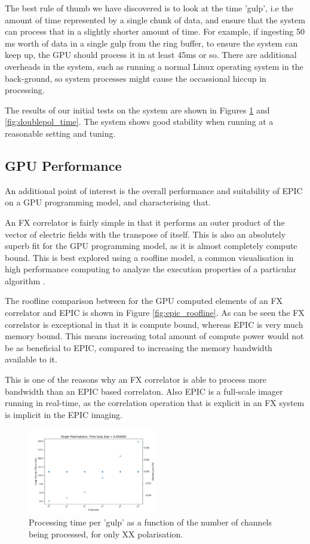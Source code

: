 \documentclass[bibliography=totocnumbered, twocolumn]{article}
\begin{document}
The best rule of thumb we have discovered is to look at the time
'gulp', i.e the amount of time represented by a single chunk of
data, and ensure that the system can process that in a slightly
shorter amount of time. For example, if ingesting 50 ms worth
of data in a single gulp from the ring buffer, to ensure the
system can keep up, the GPU should process it in at least 45ms
or so. There are additional overheads in the system, such as
running a normal Linux operating system in the back-ground,
so system processes might cause the occassional hiccup in
processing.

The results of our initial tests on the system are shown in
Figures \ref{fig:singlepol_time} and \ref{fig:doublepol_time}. The
system shows good stability when running at a reasonable setting
and tuning.

\subsection{GPU Performance}

An additional point of interest is the overall performance and
suitability of EPIC on a GPU programming model, and characterising
that.

An FX correlator is fairly simple in that it performs an outer
product of the vector of electric fields with the transpose of
itself. This is also an absolutely superb fit for the GPU
programming model, as it is almost completely compute bound. This
is best explored using a roofline model, a common visualisation in
high performance computing to analyze the execution properties
of a particular algorithm \cite{demmel_roofline:_2008}.

The roofline comparison between for the GPU computed elements of an
FX correlator and EPIC is shown in Figure \ref{fig:epic_roofline}.
As can be seen the FX correlator is exceptional in that it is
compute bound, whereas EPIC is very much memory bound. This means
increasing total amount of compute power would not be as beneficial
to EPIC, compared to increasing the memory bandwidth available to it.

This is one of the reasons why an FX correlator is able to process
more bandwidth than an EPIC based correlaton. Also EPIC is a
full-scale imager running in real-time, as the correlation
operation that is explicit in an FX system is implicit in the
EPIC imaging. 

\begin{figure}
  \centering
  \includegraphics[width=0.5\textwidth]{images/single_pol_throughput.pdf}
  \caption{Processing time per 'gulp' as a function of the number of channels being processed, for only XX polarisation.}
  \label{fig:singlepol_time}
\end{figure}
\end{document}

